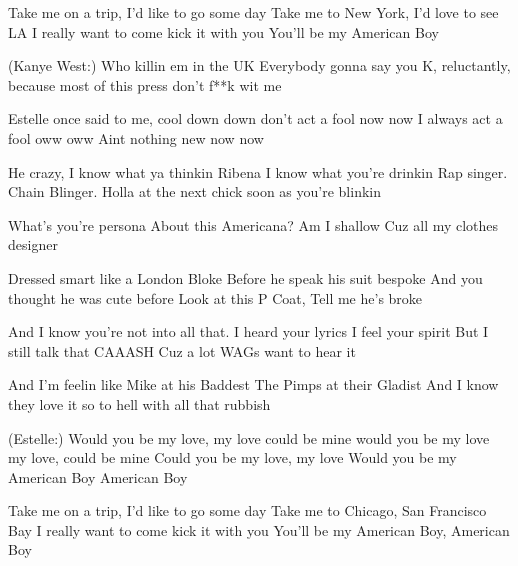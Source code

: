 \begin{guitar}
Take me on a trip, I'd like to go some day
Take me to New York, I'd love to see LA
I really want to come kick it with you
You'll be my American Boy

(Kanye West:)
Who killin em in the UK
Everybody gonna say you K,
reluctantly, because most of this press don't f**k wit me

Estelle once said to me, cool down down
don't act a fool now now
I always act a fool oww oww
Aint nothing new now now

He crazy, I know what ya thinkin
Ribena I know what you're drinkin
Rap singer. Chain Blinger.
Holla at the next chick soon as you're blinkin

What's you're persona
About this Americana?
Am I shallow 
Cuz all my clothes designer

Dressed smart like a London Bloke
Before he speak his suit bespoke
And you thought he was cute before
Look at this P Coat, Tell me he's broke

And I know you're not into all that.
I heard your lyrics I feel your spirit
But I still talk that CAAASH
Cuz a lot WAGs want to hear it

And I'm feelin like Mike at his Baddest
The Pimps at their Gladist
And I know they love it
so to hell with all that rubbish

(Estelle:)
Would you be my love, my love
could be mine would you be my love my love, could be mine
Could you be my love, my love
Would you be my American Boy
American Boy

Take me on a trip, I'd like to go some day
Take me to Chicago, San Francisco Bay
I really want to come kick it with you
You'll be my American Boy, American Boy


\end{guitar}